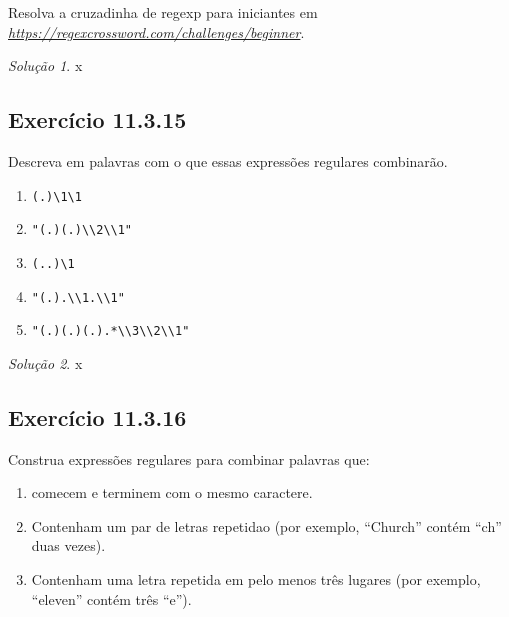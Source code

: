 \documentclass[
]{latex/krantz}
\providecommand{\tightlist}{%
  \setlength{\itemsep}{0pt}\setlength{\parskip}{0pt}}
\theoremstyle{definition}
\theoremstyle{definition}
\theoremstyle{definition}
\theoremstyle{definition}
\theoremstyle{remark}
\newtheorem*{solution}{Solução}
\begin{document}
Resolva a cruzadinha de regexp para iniciantes em \emph{\url{https://regexcrossword.com/challenges/beginner}}.

\begin{solution}
x
\end{solution}

\hypertarget{exr11-3-15}{%
\subsection*{Exercício 11.3.15}\label{exr11-3-15}}

Descreva em palavras com o que essas expressões regulares combinarão.

\begin{enumerate}
\def\labelenumi{\alph{enumi}.}
\tightlist
\item
  \texttt{(.)\textbackslash{}1\textbackslash{}1}
\item
  \texttt{"(.)(.)\textbackslash{}\textbackslash{}2\textbackslash{}\textbackslash{}1"}
\item
  \texttt{(..)\textbackslash{}1}
\item
  \texttt{"(.).\textbackslash{}\textbackslash{}1.\textbackslash{}\textbackslash{}1"}
\item
  \texttt{"(.)(.)(.).*\textbackslash{}\textbackslash{}3\textbackslash{}\textbackslash{}2\textbackslash{}\textbackslash{}1"}
\end{enumerate}

\begin{solution}
x
\end{solution}

\hypertarget{exr11-3-16}{%
\subsection*{Exercício 11.3.16}\label{exr11-3-16}}

Construa expressões regulares para combinar palavras que:

\begin{enumerate}
\def\labelenumi{\alph{enumi}.}
\tightlist
\item
  comecem e terminem com o mesmo caractere.
\item
  Contenham um par de letras repetidao (por exemplo, ``Church'' contém ``ch'' duas vezes).
\item
  Contenham uma letra repetida em pelo menos três lugares (por exemplo, ``eleven'' contém três ``e'').
\end{enumerate}
\end{document}
